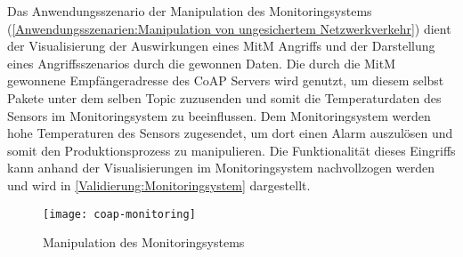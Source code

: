 Das Anwendungsszenario der Manipulation des Monitoringsystems (\autoref{Anwendungsszenarien:Manipulation von ungesichertem Netzwerkverkehr}) dient der Visualisierung der Auswirkungen eines \ac{MitM} Angriffs und der Darstellung eines Angriffsszenarios durch die gewonnen Daten. Die durch die \ac{MitM} gewonnene Empfängeradresse des \ac{CoAP} Servers wird genutzt, um diesem selbst Pakete unter dem selben Topic zuzusenden und somit die Temperaturdaten des Sensors im Monitoringsystem zu beeinflussen. Dem Monitoringsystem werden hohe Temperaturen des Sensors zugesendet, um dort einen Alarm auszulösen und somit den Produktionsprozess zu manipulieren. Die Funktionalität dieses Eingriffs kann anhand der Visualisierungen im Monitoringsystem nachvollzogen werden und wird in \autoref{Validierung:Monitoringsystem} dargestellt.

\begin{figure}[h]
  \centering
  \texttt{[image: coap-monitoring]}
  \caption{Manipulation des Monitoringsystems} 
  \label{Validierung:Monitoringsystem}
\end{figure}